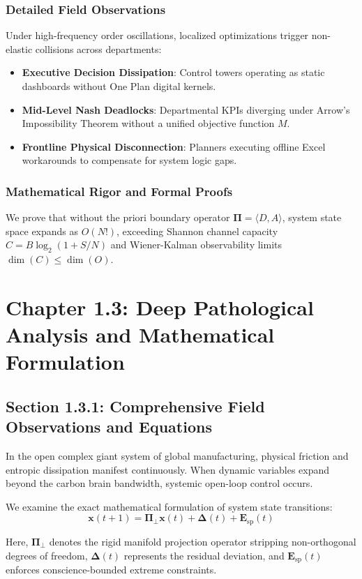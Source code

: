 \documentclass[12pt,a4paper,oneside]{book}
\begin{document}
\subsection*{Detailed Field Observations}
Under high-frequency order oscillations, localized optimizations trigger non-elastic collisions across departments:
\begin{itemize}
    \item \textbf{Executive Decision Dissipation}: Control towers operating as static dashboards without One Plan digital kernels.
    \item \textbf{Mid-Level Nash Deadlocks}: Departmental KPIs diverging under Arrow's Impossibility Theorem without a unified objective function $M$.
    \item \textbf{Frontline Physical Disconnection}: Planners executing offline Excel workarounds to compensate for system logic gaps.
\end{itemize}

\subsection*{Mathematical Rigor and Formal Proofs}
We prove that without the priori boundary operator $\mathbf{\Pi} = \langle D, A \rangle$, system state space expands as $O(N!)$, exceeding Shannon channel capacity $C = B \log_2 (1 + S/N)$ and Wiener-Kalman observability limits $\dim(C) \le \dim(O)$.
\clearpage
\chapter{Chapter 1.3: Deep Pathological Analysis and Mathematical Formulation}
\section{Section 1.3.1: Comprehensive Field Observations and Equations}

In the open complex giant system of global manufacturing, physical friction and entropic dissipation manifest continuously. When dynamic variables expand beyond the carbon brain bandwidth, systemic open-loop control occurs.

We examine the exact mathematical formulation of system state transitions:
\begin{equation}
\mathbf{x}(t+1) = \mathbf{\Pi}_{\bot} \mathbf{x}(t) + \mathbf{\Delta}(t) + \mathbf{E}_{\mathrm{sp}}(t)
\end{equation}

Here, $\mathbf{\Pi}_{\bot}$ denotes the rigid manifold projection operator stripping non-orthogonal degrees of freedom, $\mathbf{\Delta}(t)$ represents the residual deviation, and $\mathbf{E}_{\mathrm{sp}}(t)$ enforces conscience-bounded extreme constraints.
\end{document}

